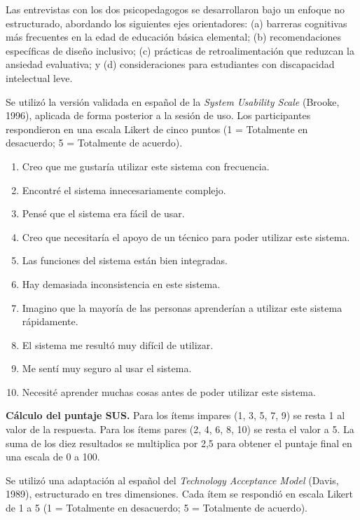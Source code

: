 Las entrevistas con los dos psicopedagogos se desarrollaron bajo un enfoque no estructurado, abordando los siguientes ejes orientadores: (a) barreras cognitivas más frecuentes en la edad de educación básica elemental; (b) recomendaciones específicas de diseño inclusivo; (c) prácticas de retroalimentación que reduzcan la ansiedad evaluativa; y (d) consideraciones para estudiantes con discapacidad intelectual leve.


Se utilizó la versión validada en español de la \textit{System Usability Scale} (Brooke, 1996), aplicada de forma posterior a la sesión de uso. Los participantes respondieron en una escala Likert de cinco puntos (1 = Totalmente en desacuerdo; 5 = Totalmente de acuerdo).

\begin{enumerate}[leftmargin=*]
\item Creo que me gustaría utilizar este sistema con frecuencia.
\item Encontré el sistema innecesariamente complejo.
\item Pensé que el sistema era fácil de usar.
\item Creo que necesitaría el apoyo de un técnico para poder utilizar este sistema.
\item Las funciones del sistema están bien integradas.
\item Hay demasiada inconsistencia en este sistema.
\item Imagino que la mayoría de las personas aprenderían a utilizar este sistema rápidamente.
\item El sistema me resultó muy difícil de utilizar.
\item Me sentí muy seguro al usar el sistema.
\item Necesité aprender muchas cosas antes de poder utilizar este sistema.
\end{enumerate}

\textbf{Cálculo del puntaje SUS.} Para los ítems impares (1, 3, 5, 7, 9) se resta 1 al valor de la respuesta. Para los ítems pares (2, 4, 6, 8, 10) se resta el valor a 5. La suma de los diez resultados se multiplica por 2,5 para obtener el puntaje final en una escala de 0 a 100.


Se utilizó una adaptación al español del \textit{Technology Acceptance Model} (Davis, 1989), estructurado en tres dimensiones. Cada ítem se respondió en escala Likert de 1 a 5 (1 = Totalmente en desacuerdo; 5 = Totalmente de acuerdo).

